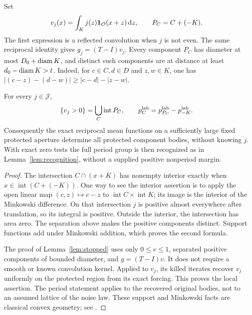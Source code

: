 Set
\begin{equation}\label{eq:blurred-occupation}
 v_j(x)=\int_K j(z)\mathbf 1_{\mathcal O}(x+z)\,\mathrm d z,\qquad
 P_C=C+(-K).
\end{equation}
The first expression is a reflected convolution when $j$ is not even.
The same reciprocal identity gives $g_j=(T-I)v_j$. Every component
$P_C$ has diameter at most $D_0+\operatorname{diam} K$, and distinct such components
are at distance at least $d_0-\operatorname{diam} K>t$. Indeed, for $c\in C,d\in D$
and $z,w\in K$, one has
$|(c-z)-(d-w)|\ge |c-d|-|z-w|$.

\begin{lemma}
\label{lem:noise-support}
For every $j\in\mathcal J$,
\begin{equation}\label{eq:noise-support}
 \{v_j>0\}=\bigcup_C\operatorname{int}P_C,\qquad
             p_C^{\rm lab}=p_{P_C}^{\rm lab}-p_{-K}^{\rm lab}.
\end{equation}
Consequently the exact reciprocal mean functions on a sufficiently
large fixed protected aperture determine all protected component bodies,
without knowing $j$. With exact zero tests the full period group is then
recognized as in Lemma~\ref{lem:recognition}, without a supplied positive
nonperiod margin.
\end{lemma}
\begin{proof}
The intersection $C\cap(x+K)$ has nonempty interior exactly when
$x\in\operatorname{int}(C+(-K))$. One way to see the interior assertion
is to apply the open linear map $(c,z)\mapsto c-z$ to
$\operatorname{int}C\times\operatorname{int}K$; its image is the interior
of the Minkowski difference. On that intersection $j$ is positive
almost everywhere after translation, so its integral is positive.
Outside the interior, the intersection has area zero. The separation
above makes the positive components distinct. Support functions add
under Minkowski addition, which proves the second formula.

The proof of Lemma~\ref{lem:stopped} uses only $0\le v\le1$,
separated positive components of bounded diameter, and $g=(T-I)v$.
It does not require a smooth or known convolution kernel. Applied to
$v_j$, its killed iterates recover $v_j$ uniformly on the protected
region from its exact forcing. This proves the local assertion. The
period statement applies to the recovered original bodies, not to an
assumed lattice of the noise law. These support and Minkowski facts are
classical convex geometry; see \cite{Schneider}.
\end{proof}

